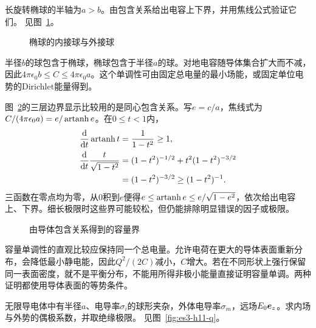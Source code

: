 \begin{exercise}[椭球电容的单调界]\label{ex:es3-h10}
长旋转椭球的半轴为$a>b$。由包含关系给出电容上下界，并用焦线公式验证它们。 见图~\ref{fig:es3-h10-q}。
\end{exercise}

\begin{figure}[H]\centering
{}
\caption{椭球的内接球与外接球}\label{fig:es3-h10-q}
\end{figure}
\begin{solution}
半径$b$的球包含于椭球，椭球包含于半径$a$的球。对地电容随导体集合扩大而不减，因此$4\pi\epsilon_0b\le C\le4\pi\epsilon_0a$。这个单调性可由固定总电量的最小场能，或固定单位电势的Dirichlet能量得到。

图~\ref{fig:es3-h10-s}的三层边界显示比较用的是同心包含关系。写$e=c/a$，焦线式为$C/(4\pi\epsilon_0a)=e/\operatorname{artanh} e$。在$0\le t<1$内，
\[\begin{aligned}
\frac{\mathop{}\!\mathrm d}{\mathop{}\!\mathrm d t}\operatorname{artanh} t&=\frac1{1-t^2}\ge1,\\
\frac{\mathop{}\!\mathrm d}{\mathop{}\!\mathrm d t}\frac{t}{\sqrt{1-t^2}}
&=(1-t^2)^{-1/2}+t^2(1-t^2)^{-3/2}\\
&=(1-t^2)^{-3/2}\ge(1-t^2)^{-1}.
\end{aligned}\]
三函数在零点均为零，从$0$积到$e$便得$e\le\operatorname{artanh} e\le e/\sqrt{1-e^2}$，依次给出电容上、下界。细长极限时这些界可能较松，但仍能排除明显错误的因子或极限。
\begin{figure}[H]\centering
{}
\caption{由导体包含关系得到的容量界}\label{fig:es3-h10-s}
\end{figure}


容量单调性的直观比较应保持同一个总电量。允许电荷在更大的导体表面重新分布，会降低最小静电能，因此$Q^2/(2C)$减小，$C$增大。若在不同形状上强行保留同一表面密度，就不是平衡分布，不能用所得非极小能量直接证明容量单调。两种证明都使用导体表面的等势条件。
\end{solution}

\begin{exercise}[导电夹杂与绝缘孔的系数比较]\label{ex:es3-h11}
无限导电体中有半径$a$、电导率$\sigma_i$的球形夹杂，外体电导率$\sigma_m$，远场$E_0\bm{e}_z$。求内场与外势的偶极系数，并取绝缘极限。 见图~\ref{fig:es3-h11-q}。
\end{exercise}

